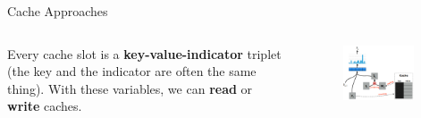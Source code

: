 \begin{frame}[c]{Cache Approaches}
	\begin{columns}[c] %
		\begin{column}{.50\textwidth}
			Every cache slot is a \textbf{key-value-indicator} triplet (the key and the indicator are often the same thing). With these variables, we can \textbf{read} or \textbf{write} caches.
			\vspace{0.3cm}
		\end{column}%
		\hfill%
		\begin{column}{.50\textwidth}
			\begin{figure}
				\centering
				\includegraphics[width=0.9\textwidth]{Images/cache_only}
				\label{fig:cacheonly}
			\end{figure}
		\end{column}%
	\end{columns} 
\end{frame}

